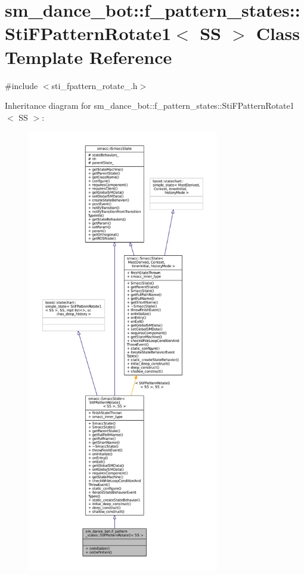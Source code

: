 \hypertarget{structsm__dance__bot_1_1f__pattern__states_1_1StiFPatternRotate1}{}\section{sm\+\_\+dance\+\_\+bot\+:\+:f\+\_\+pattern\+\_\+states\+:\+:Sti\+F\+Pattern\+Rotate1$<$ SS $>$ Class Template Reference}
\label{structsm__dance__bot_1_1f__pattern__states_1_1StiFPatternRotate1}


{\ttfamily \#include $<$sti\+\_\+fpattern\+\_\+rotate\+\_.\+h$>$}



Inheritance diagram for sm\+\_\+dance\+\_\+bot\+:\+:f\+\_\+pattern\+\_\+states\+:\+:Sti\+F\+Pattern\+Rotate1$<$ SS $>$\+:
\nopagebreak
\begin{figure}[H]
\begin{center}
\leavevmode
\includegraphics[height=550pt]{structsm__dance__bot_1_1f__pattern__states_1_1StiFPatternRotate1__inherit__graph}
\end{center}
\end{figure}



